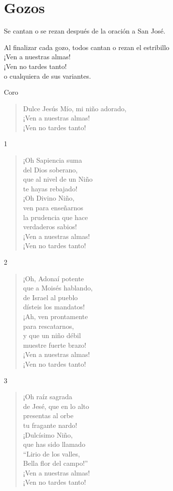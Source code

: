 \documentclass[spanish,utf8,twocolumn]{chlart}
\newenvironment{summary}{\begingroup
	\small\sffamily\itshape%
	\setlength{\leftskip}{3em}\setlength{\rightskip}{3em}\noindent
	}{\par\endgroup}
\newenvironment{gozo}{\begin{verse}\color{lector}}{\end{verse}}
\newcommand*\vena{{\color{responden}\hspace{1em}¡Ven a nuestras almas!\\\hspace{1em}¡Ven no tardes tanto!}}
\begin{document}
\section{Gozos}
\begin{summary}
Se cantan o se rezan después de la oración a San José.

Al finalizar cada gozo, todos cantan o rezan el estribillo \\\vena\\o cualquiera de sus variantes.
\end{summary}

\newpage Coro
\begin{gozo}
Dulce Jesús Mío, mi niño adorado,\\
\vena
\end{gozo}

1
\begin{gozo}
¡Oh Sapiencia suma\\del Dios soberano,\\
que al nivel de un Niño\\te hayas rebajado!\\
¡Oh Divino Niño,\\ven para enseñarnos\\
la prudencia que hace\\verdaderos sabios!\\
\vena
\end{gozo}

2
\begin{gozo}
¡Oh, Adonaí potente\\
que a Moisés hablando,\\
de Israel al pueblo\\
dísteis los mandatos!\\
¡Ah, ven prontamente\\
para rescatarnos,\\
y que un niño débil\\
muestre fuerte brazo!\\
\vena
\end{gozo}

3
\begin{gozo}
¡Oh raíz sagrada\\
de Jesé, que en lo alto\\
presentas al orbe\\
tu fragante nardo!\\
¡Dulcísimo Niño,\\
que has sido llamado\\
“Lirio de los valles,\\
Bella flor del campo!”\\
\vena
\end{gozo}
\end{document}
